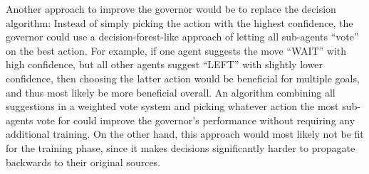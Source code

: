 Another approach to improve the governor would be to replace the decision algorithm: Instead of simply picking the
action with the highest confidence, the governor could use a decision-forest-like approach of letting all sub-agents
\enquote{vote} on the best action.
For example, if one agent suggests the move \enquote{WAIT} with high confidence, but all other agents suggest
\enquote{LEFT} with slightly lower confidence, then choosing the latter action would be beneficial for multiple goals,
and thus most likely be more beneficial overall.
An algorithm combining all suggestions in a weighted vote system and picking whatever action the most sub-agents vote
for could improve the governor's performance without requiring any additional training.
On the other hand, this approach would most likely not be fit for the training phase, since it makes decisions
significantly harder to propagate backwards to their original sources.
